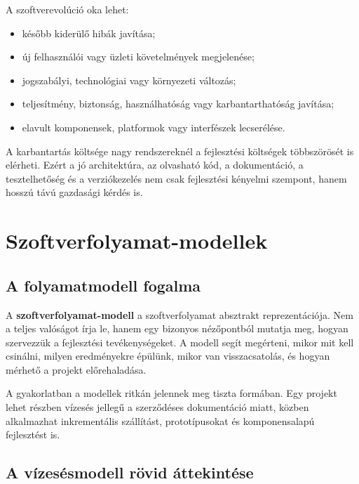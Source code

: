 A szoftverevolúció oka lehet:

\begin{itemize}
  \item később kiderülő hibák javítása;
  \item új felhasználói vagy üzleti követelmények megjelenése;
  \item jogszabályi, technológiai vagy környezeti változás;
  \item teljesítmény, biztonság, használhatóság vagy karbantarthatóság javítása;
  \item elavult komponensek, platformok vagy interfészek lecserélése.
\end{itemize}

A karbantartás költsége nagy rendszereknél a fejlesztési költségek többszörösét is elérheti. Ezért a jó architektúra, az olvasható kód, a dokumentáció, a tesztelhetőség és a verziókezelés nem csak fejlesztési kényelmi szempont, hanem hosszú távú gazdasági kérdés is.

\section{Szoftverfolyamat-modellek}

\subsection{A folyamatmodell fogalma}

A \textbf{szoftverfolyamat-modell} a szoftverfolyamat absztrakt reprezentációja. Nem a teljes valóságot írja le, hanem egy bizonyos nézőpontból mutatja meg, hogyan szervezzük a fejlesztési tevékenységeket. A modell segít megérteni, mikor mit kell csinálni, milyen eredményekre épülünk, mikor van visszacsatolás, és hogyan mérhető a projekt előrehaladása.

\begin{center}

\end{center}

A gyakorlatban a modellek ritkán jelennek meg tiszta formában. Egy projekt lehet részben vízesés jellegű a szerződéses dokumentáció miatt, közben alkalmazhat inkrementális szállítást, prototípusokat és komponensalapú fejlesztést is.

\subsection{A vízesésmodell rövid áttekintése}

